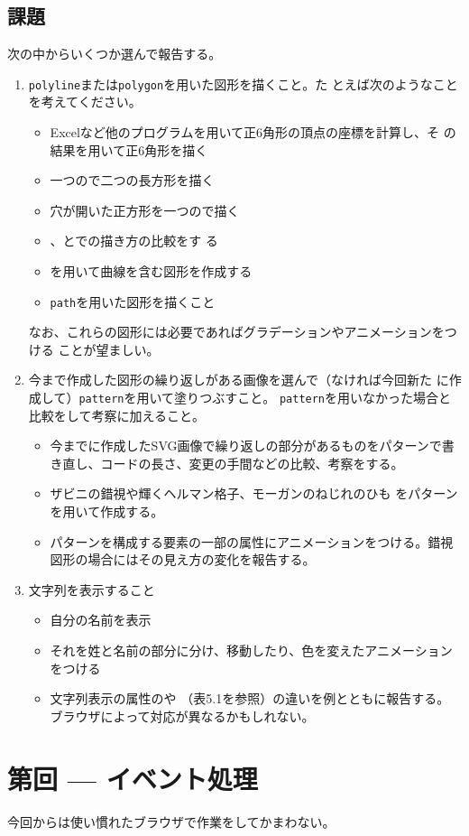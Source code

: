 \documentclass[a4j]{jarticle}
\renewcommand{\Section}[1]{%
\newpage \stepcounter{ReportNo}\section{第\theReportNo 回 --- #1}
}
\begin{document}
\subsection{課題}
次の中からいくつか選んで報告する。
\begin{enumerate}
 \item \texttt{polyline}または\texttt{polygon}を用いた図形を描くこと。た
       とえば次のようなことを考えてください。
   \begin{itemize}
    \item Excelなど他のプログラムを用いて正6角形の頂点の座標を計算し、そ
          の結果を用いて正6角形を描く
    \item 一つので二つの長方形を描く
    \item 穴が開いた正方形を一つので描く
    \item {}、とでの描き方の比較をす
          る
    \item {}を用いて曲線を含む図形を作成する
   \end{itemize}
\begin{itemize}
 \item \texttt{path}を用いた図形を描くこと
\end{itemize}
なお、これらの図形には必要であればグラデーションやアニメーションをつける
       ことが望ましい。
 \item 今まで作成した図形の繰り返しがある画像を選んで（なければ今回新た
       に作成して）\texttt{pattern}を用いて塗りつぶすこと。
       \texttt{pattern}を用いなかった場合と比較をして考察に加えること。
 \begin{itemize}
  \item 今までに作成したSVG画像で繰り返しの部分があるものをパターンで書
        き直し、コードの長さ、変更の手間などの比較、考察をする。
  \item ザビニの錯視や輝くヘルマン格子、モーガンのねじれのひも
        をパターンを用いて作成する。
  \item パターンを構成する要素の一部の属性にアニメーションをつける。錯視
        図形の場合にはその見え方の変化を報告する。
 \end{itemize}
 \item 文字列を表示すること
\begin{itemize}
 \item 自分の名前を表示
 \item それを姓と名前の部分に分け、移動したり、色を変えたアニメーション
       をつける
 \item 文字列表示の属性のや
       （表5.1を参照）の違いを例とともに報告する。
       ブラウザによって対応が異なるかもしれない。
\end{itemize}
\end{enumerate}
\Section{イベント処理}
今回からは使い慣れたブラウザで作業をしてかまわない。
\end{document}
